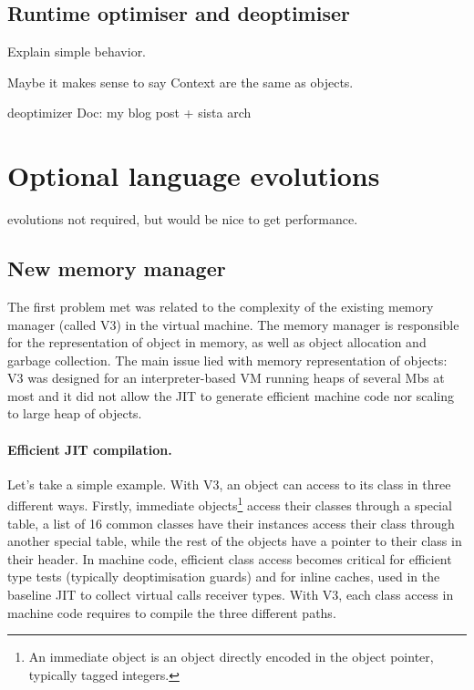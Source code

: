 \documentclass[a4paper,12pt,twoside]{../includes/ThesisStyle}
\begin{document}
\subsection{Runtime optimiser and deoptimiser}

Explain simple behavior.

Maybe it makes sense to say Context are the same as objects.

deoptimizer 
Doc: my blog post + sista arch


\section{Optional language evolutions}

evolutions not required, but would be nice to get performance.

\subsection{New memory manager}


The first problem met was related to the complexity of the existing memory manager (called V3) in the virtual machine. The memory manager is responsible for the representation of object in memory, as well as object allocation and garbage collection. The main issue lied with memory representation of objects: V3 was designed for an interpreter-based VM running heaps of several Mbs at most and it did not allow the JIT to generate efficient machine code nor scaling to large heap of objects.

\paragraph{Efficient JIT compilation.} Let's take a simple example. With V3, an object can access to its class in three different ways. Firstly, immediate objects\footnote{An immediate object is an object directly encoded in the object pointer, typically tagged integers.} access their classes through a special table, a list of 16 common classes have their instances access their class through another special table, while the rest of the objects have a pointer to their class in their header. In machine code, efficient class access becomes critical for efficient type tests (typically deoptimisation guards) and for inline caches, used in the baseline JIT to collect virtual calls receiver types. With V3, each class access in machine code requires to compile the three different paths. 
\end{document}
